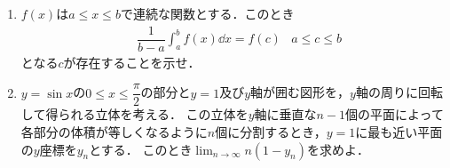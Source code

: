 \documentclass[../../main.tex]{subfiles}
\begin{document}
\begin{enumerate}
  \item $f(x)$は$a\le x \le b$で連続な関数とする．このとき
    \begin{align*}
      & \dfrac{1}{b-a}\int_{a}^{b}f(x)\dd x=f(c) & a\le c \le b
    \end{align*}
    となる$c$が存在することを示せ．
  \item $y=\sin x$の$0\le x\le \dfrac{\pi}{2}$の部分と$y=1$及び$y$軸が囲む図形を，$y$軸の周りに回転して得られる立体を考える．
    この立体を$y$軸に垂直な$n-1$個の平面によって各部分の体積が等しくなるように$n$個に分割するとき，$y=1$に最も近い平面の$y$座標を$y_n$とする．
    このとき${\displaystyle \lim_{n\to\infty} n\left(1-y_n\right)}$を求めよ．
\end{enumerate}
\end{document}
